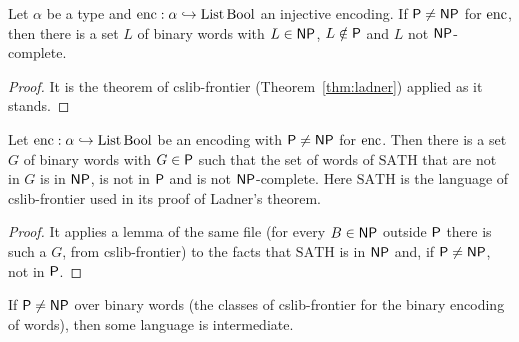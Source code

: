 \begin{theorem}
  \label{thm:structure-ladner-cslib}
  \leanok
  Let $\alpha$ be a type and $\mathrm{enc} : \alpha \hookrightarrow \mathrm{List}\,\mathrm{Bool}$ an
  injective encoding. If $\mathsf{P} \neq \mathsf{NP}$ for $\mathrm{enc}$, then there is a set $L$ of binary words with
  $L \in \mathsf{NP}$, $L \notin \mathsf{P}$ and $L$ not $\mathsf{NP}$-complete.
\end{theorem}

\begin{proof}
  \leanok
  It is the theorem of cslib-frontier (Theorem~\ref{thm:ladner}) applied as it stands.
\end{proof}

\begin{theorem}
  \label{thm:structure-ladner-palabras}
  \leanok
  Let $\mathrm{enc} : \alpha \hookrightarrow \mathrm{List}\,\mathrm{Bool}$ be an encoding with $\mathsf{P} \neq
  \mathsf{NP}$ for $\mathrm{enc}$. Then there is a set $G$ of binary words with $G \in \mathsf{P}$ such that the set
  of words of $\mathrm{SATH}$ that are not in $G$ is in $\mathsf{NP}$, is not in $\mathsf{P}$ and is not
  $\mathsf{NP}$-complete. Here $\mathrm{SATH}$ is the language of cslib-frontier used in its proof of
  Ladner's theorem.
\end{theorem}

\begin{proof}
  \leanok
  It applies a lemma of the same file (for every $B \in \mathsf{NP}$ outside $\mathsf{P}$ there is such a $G$,
  from cslib-frontier) to the facts that $\mathrm{SATH}$ is in $\mathsf{NP}$ and, if $\mathsf{P} \neq \mathsf{NP}$,
  not in $\mathsf{P}$.
\end{proof}

\begin{theorem}
  \label{thm:structure-ladner-fractal}
  \leanok
  If $\mathsf{P} \neq \mathsf{NP}$ over binary words (the classes of cslib-frontier for the binary encoding of
  words), then some language is intermediate.
\end{theorem}

